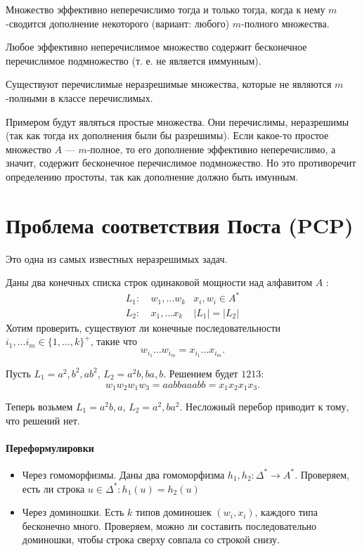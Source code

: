 \begin{thm}
    Множество эффективно неперечислимо тогда и только тогда, когда к нему $m$-сводится дополнение некоторого (вариант: любого) $m$-полного множества.
\end{thm}
\begin{thm}
    Любое эффективно неперечислимое множество содержит бесконечное перечислимое подмножество (т. е. не является иммунным).
\end{thm}
\begin{st}
	Существуют перечислимые неразрешимые множества, которые не являются $ m$-полными в классе перечислимых.
\end{st}
\begin{proof*}
    Примером будут являться простые множества. Они перечислимы, неразрешимы (так как тогда их дополнения были бы разрешимы). Если какое-то простое множество $A$ --- $m$-полное, то его дополнение эффективно неперечислимо, а значит, содержит бесконечное перечислимое подмножество. Но это противоречит определению простоты, так как дополнение должно быть имунным.
\end{proof*}


\section{Проблема соответствия Поста (PCP)}
Это одна из самых известных неразрешимых задач.

Даны два конечных списка строк одинаковой мощности над алфавитом $ A$ :
\[
\begin{aligned}
	L_1 :& ~w_1, \ldots w_k & x_i, w_i \in A^{*} \\
	L_2: & ~x_1, \ldots x_k & \lvert L_1 \rvert = \lvert L_2 \rvert  
\end{aligned}
\]
Хотим проверить, существуют ли конечные последовательности $  i_1, \ldots i_m \in \{1, \ldots , k\}^+$, такие что $$ w_{i_1}\ldots w_{i_m} = x_{i_1}\ldots x_{i_m}.$$


\begin{ex}
    Пусть $  L_1 = a^2, b^2, ab ^2$, $  L_2 = a^2b, ba, b$. Решением будет $ 1213$:
	 \[
	w_1 w_2 w_1 w_3 = aabbaaabb = x_1x_2x_1x_3
	.\] 
\end{ex}
\begin{ex}
    Теперь возьмем  $  L_1 = a^2b, a$, $  L_2 = a^2, ba^2$. Несложный перебор приводит к тому, что решений нет.
\end{ex}

\paragraph{Переформулировки}
\begin{itemize}
	\item Через гомоморфизмы. Даны два гомоморфизма $ h_1, h_2\colon \Delta^{*} \to A^{*}$. Проверяем, есть ли строка $ u \in \Delta^{*}\colon h_1(u) = h_2(u)$ 
	\item Через доминошки. Есть $ k$ типов доминошек $ (w_i, x_i)$, каждого типа бесконечно много. Проверяем, можно ли составить последовательно доминошки, чтобы строка сверху совпала со строкой снизу.
\end{itemize}


